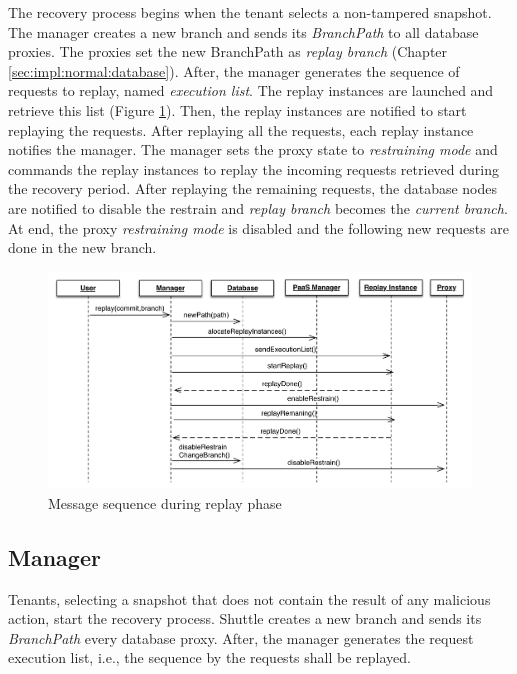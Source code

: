 The recovery process begins when the tenant selects a non-tampered snapshot. The manager creates a new branch and sends its \emph{BranchPath} to all database proxies. The proxies set the new BranchPath as \emph{replay branch} (Chapter \ref{sec:impl:normal:database}). After, the manager generates the sequence of requests to replay, named \emph{execution list}. The replay instances are launched and retrieve this list (Figure \ref{fig:messaging_replay}). Then, the replay instances are notified to start replaying the requests. After replaying all the requests, each replay instance notifies the manager. The manager sets the proxy state to \emph{restraining mode} and commands the replay instances to replay the incoming requests retrieved during the recovery period. After replaying the remaining requests, the database nodes are notified to disable the restrain and \emph{replay branch} becomes the \emph{current branch}. At end, the proxy \emph{restraining mode} is disabled and the following new requests are done in the new branch.

\begin{figure}
  \centering
  \includegraphics[width=140mm]{images/message_replay}
  \caption{Message sequence during replay phase}
  \label{fig:messaging_replay}
\end{figure}


\subsection{Manager}\label{sec:impl:recovery:manager}
Tenants, selecting a snapshot that does not contain the result of any malicious action, start the recovery process. Shuttle creates a new branch and sends its \emph{BranchPath} every database proxy. After, the manager generates the request execution list, i.e., the sequence by the requests shall be replayed.


